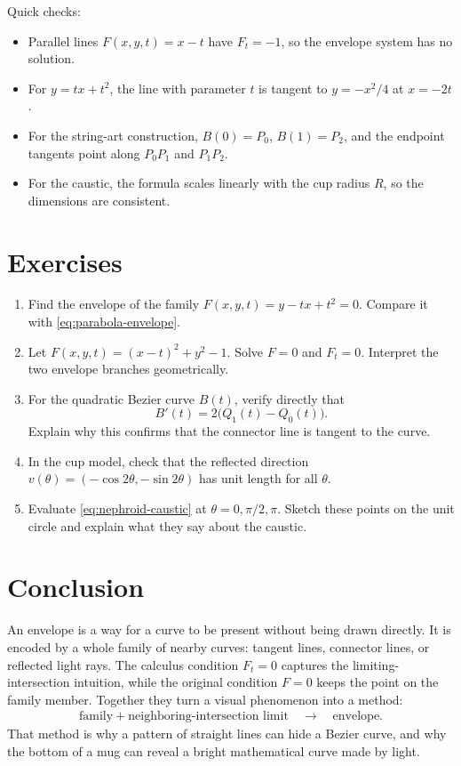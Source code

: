 \documentclass[11pt]{article}
\begin{document}
\begin{checkpointbox}
Quick checks:
\begin{itemize}
  \item Parallel lines \(F(x,y,t)=x-t\) have \(F_t=-1\), so the envelope system has no solution.
  \item For \(y=tx+t^2\), the line with parameter \(t\) is tangent to \(y=-x^2/4\) at \(x=-2t\).
  \item For the string-art construction, \(B(0)=P_0\), \(B(1)=P_2\), and the endpoint tangents point along \(P_0P_1\) and \(P_1P_2\).
  \item For the caustic, the formula scales linearly with the cup radius \(R\), so the dimensions are consistent.
\end{itemize}
\end{checkpointbox}

\section{Exercises}

\begin{enumerate}
  \item Find the envelope of the family \(F(x,y,t)=y-tx+t^2=0\). Compare it with \cref{eq:parabola-envelope}.
  \item Let \(F(x,y,t)=(x-t)^2+y^2-1\). Solve \(F=0\) and \(F_t=0\). Interpret the two envelope branches geometrically.
  \item For the quadratic Bezier curve \(B(t)\), verify directly that
  \[
    B'(t)=2\bigl(Q_1(t)-Q_0(t)\bigr).
  \]
  Explain why this confirms that the connector line is tangent to the curve.
  \item In the cup model, check that the reflected direction \(v(\theta)=(-\cos2\theta,-\sin2\theta)\) has unit length for all \(\theta\).
  \item Evaluate \cref{eq:nephroid-caustic} at \(\theta=0,\pi/2,\pi\). Sketch these points on the unit circle and explain what they say about the caustic.
\end{enumerate}

\section{Conclusion}

An envelope is a way for a curve to be present without being drawn directly. It is encoded by a whole family of nearby curves: tangent lines, connector lines, or reflected light rays. The calculus condition \(F_t=0\) captures the limiting-intersection intuition, while the original condition \(F=0\) keeps the point on the family member. Together they turn a visual phenomenon into a method:
\begin{align}
  \text{family} + \text{neighboring-intersection limit}
  \quad\longrightarrow\quad
  \text{envelope}.
\end{align}
That method is why a pattern of straight lines can hide a Bezier curve, and why the bottom of a mug can reveal a bright mathematical curve made by light.
\end{document}
